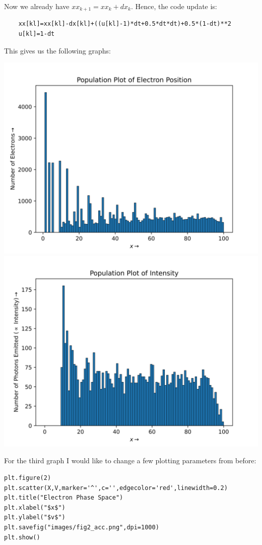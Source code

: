 \documentclass[12pt]{article}
\begin{document}
Now we already have $xx_{k+1} = xx_{k} + dx_{k}$. Hence, the code update is:

\begin{verbatim}
    xx[kl]=xx[kl]-dx[kl]+((u[kl]-1)*dt+0.5*dt*dt)+0.5*(1-dt)**2
    u[kl]=1-dt
\end{verbatim}
\pagebreak
This gives us the following graphs:

\begin{center}
    \includegraphics{images/fig0_acc.png}
    \includegraphics{images/fig1_acc.png}
\end{center}
\pagebreak
For the third graph I would like to change a few plotting parameters from before:

\begin{lstlisting}
plt.figure(2)
plt.scatter(X,V,marker='^',c='',edgecolor='red',linewidth=0.2)
plt.title("Electron Phase Space")
plt.xlabel("$x$")
plt.ylabel("$v$")
plt.savefig("images/fig2_acc.png",dpi=1000)
plt.show()
\end{lstlisting}
\end{document}
